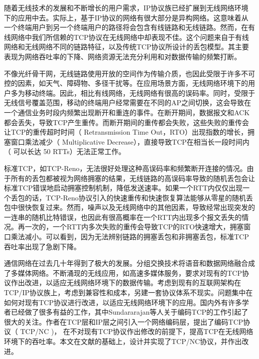 \par
随着无线技术的发展和不断增长的用户需求，IP协议族已经扩展到无线网络环境下的应用中去。实际上，基于IP协议的网络有很大部分是异构网络。这意味着从一个终端用户到另一个终端用户的路径将会包含有线链路和无线链路。然而，在有线网络中我们所信赖的TCP协议在无线网络中却表现不佳。这个问题来自于有线网络和无线网络不同的链路特征，以及传统TCP协议所设计的丢包模型。其主要表现为网络吞吐率的下降、网络资源无法充分利用和对数据传输的频繁打断。

\par
不像光纤骨干网，无线链路使用开放的空间作为传输介质，也因此受限于许多不可控的因素，如天气、障碍物、多径干扰等。在应用场景方面，无线网络环境下的用户多为移动终端。因此，相比有线网络，无线网络有很高的误码率。同时，受限于无线信号覆盖范围，移动的终端用户经常需要在不同的AP之间切换，这会导致在一个通信业务时段内频繁出现断开和重连的事件。在断开期间，数据报文和ACK都会丢失，导致TCP产生重传。而断开期间的重传都会失败，这些失败的重传会让TCP的重传超时时间（ Retransmission Time Out，RTO）出现指数的增长，拥塞窗口乘法减少（ Multiplicative Decrease），直接导致TCP在相当长一段时间内（  可以长达 50 RTTs）无法正常工作\textsuperscript{\cite{YE2005}}。
\par
标准TCP，如TCP-Reno，无法很好处理这种高误码率和频繁断开连接的情况。由于所有的丢包都被视为网络拥塞的结果，无线链路的高误码率导致的随机丢包会让标准TCP错误地启动拥塞控制机制，降低发送速率。如果一个RTT内仅仅出现一个丢包的话，TCP-Reno协议引入的快速重传和快速恢复算法能够从零星的随机丢包中很快恢复过来。然而，噪声以及无线网络中的其他因素，导致经常出现突发的一连串的随机比特错误，也因此有很高概率在一个RTT内出现多个报文丢失的情况。再一次的，一个RTT内多次失败的重传会导致TCP的RTO快速增大，拥塞窗口乘法减小。可以看到，因为无法辨别链路的拥塞丢包和非拥塞丢包，标准TCP吞吐率出现了急剧下降。

\par
通信网络在过去几十年得到了极大的发展。分组交换技术将语音和数据网络融合成了多媒体网络。不断涌现的无线应用，如高速多媒体服务，要求对现有的TCP协议作出改进，以适应无线网络环境下的数据传输。考虑到现有的互联网架构在TCP/IP协议族上，考虑到兼容性和成本，另建一套协议体系不现实。问题集中在如何对现有TCP协议进行改进，以适应无线网络环境下的应用。国内外有许多学者已经做了很多有益的工作，其中Sundararajan等人关于编码TCP\textsuperscript{\cite{Sundararajan2009}}的工作引起了很大的关注。作者在TCP层和IP层之间引入一个网络编码层，提出了编码TCP协议（ TCP/NC )， 在不对现有TCP协议作出修改的前提下，提高TCP在无线网络环境下的吞吐率。本文在文献\cite{Sundararajan2009}的基础上，设计并实现了TCP/NC协议，并作出改进。


